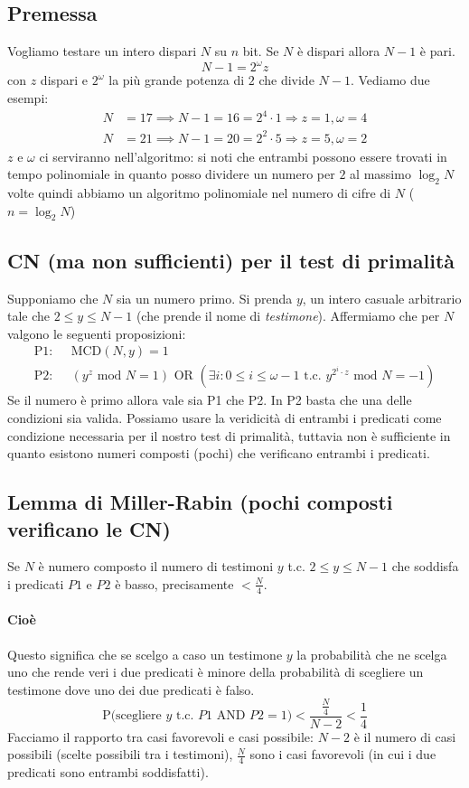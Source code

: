\subsection{Premessa}
Vogliamo testare un intero dispari $N$ su $n$ bit. Se $N$ è dispari allora $N-1$ è pari.
$$
N-1 = 2^{\omega}z
$$
con $z$ dispari e $2^{\omega}$ la più grande potenza di $2$ che divide $N-1$. Vediamo due esempi:
\begin{align*}
	N &= 17 \implies N-1 = 16 = 2^{4} \cdot 1 \Longrightarrow z=1,\omega=4\\
	N &= 21 \implies N-1 = 20 = 2^{2} \cdot 5 \Longrightarrow z=5, \omega =2
\end{align*}
$z$ e $\omega$ ci serviranno nell'algoritmo: si noti che entrambi possono essere trovati in tempo polinomiale in quanto posso dividere un numero per $2$ al massimo $\log_2N$ volte quindi abbiamo un algoritmo polinomiale nel numero di cifre di $N$ ($n = \log_2N$)

\subsection{CN (ma non sufficienti) per il test di primalità} Supponiamo che $N$ sia un numero primo. Si prenda $y$, un intero casuale arbitrario tale che $ 2 \leq y \leq N-1 $ (che prende il nome di \emph{testimone}). Affermiamo che per $N$ valgono le seguenti proposizioni:
\begin{align*}
	\text{P1}:&\text{ } \text{MCD}(N, y) = 1\\\text{P2}:&\text{ } \left(y^z \text{ mod } N = 1\right) \text{ OR } \left(\exists i: 0 \leq i \leq \omega - 1 \text{ t.c. } y^{2^i \cdot z} \text{ mod } N = -1\right)
\end{align*}
Se il numero è primo allora vale sia P1 che P2. In P2 basta che una delle condizioni sia valida. Possiamo usare la veridicità di entrambi i predicati come condizione necessaria per il nostro test di primalità, tuttavia non è sufficiente in quanto esistono numeri composti (pochi) che verificano entrambi i predicati.

\subsection{Lemma di Miller-Rabin (pochi composti verificano le CN)}
Se $N$ è numero composto il numero di testimoni $y$ t.c. $2 \leq y \leq N-1$ che soddisfa i predicati $P1$ e $P2$ è basso, precisamente $< \frac{N}{4}$.
\paragraph{Cioè} Questo significa che se scelgo a caso un testimone $y$ la probabilità che ne scelga uno che rende veri i due predicati è minore della probabilità di scegliere un testimone dove uno dei due predicati è falso.
$$
    \text{P(scegliere $y$ t.c. $P1 \text{ AND } P2 = 1$)} < \frac{\frac{N}{4}}{N-2} < \frac{1}{4}
$$
Facciamo il rapporto tra casi favorevoli e casi possibile: $N-2$ è il numero di casi possibili (scelte possibili tra i testimoni), $\frac{N}{4}$ sono i casi favorevoli (in cui i due predicati sono entrambi soddisfatti).
